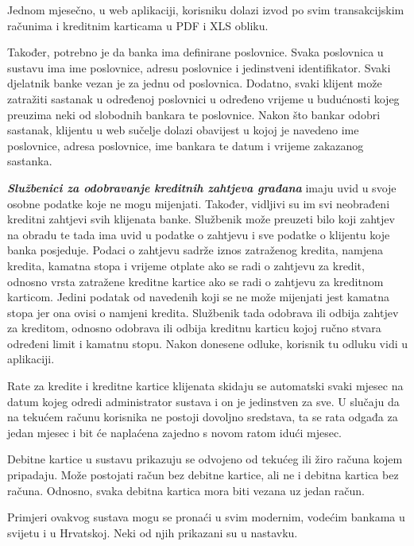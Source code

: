 		Jednom mjesečno, u web aplikaciji, korisniku dolazi izvod po svim transakcijskim računima i kreditnim karticama u PDF i XLS obliku.
		
		Također, potrebno je da banka ima definirane poslovnice. Svaka poslovnica u sustavu ima ime poslovnice, adresu poslovnice i jedinstveni identifikator. Svaki djelatnik banke vezan je za jednu od poslovnica. Dodatno, svaki klijent može zatražiti sastanak u određenoj poslovnici u određeno vrijeme u budućnosti kojeg preuzima neki od slobodnih bankara te poslovnice. Nakon što bankar odobri sastanak, klijentu u web sučelje dolazi obavijest u kojoj je navedeno ime poslovnice, adresa poslovnice, ime bankara te datum i vrijeme zakazanog sastanka.
		
		\textit{\textbf{Službenici za odobravanje kreditnih zahtjeva građana}} imaju uvid u svoje osobne podatke koje ne mogu mijenjati. Također, vidljivi su im svi neobrađeni kreditni zahtjevi svih klijenata banke. Službenik može preuzeti bilo koji zahtjev na obradu te tada ima uvid u podatke o zahtjevu i sve podatke o klijentu koje banka posjeduje. Podaci o zahtjevu sadrže iznos zatraženog kredita, namjena kredita, kamatna stopa i vrijeme otplate ako se radi o zahtjevu za kredit, odnosno vrsta zatražene kreditne kartice ako se radi o zahtjevu za kreditnom karticom. Jedini podatak od navedenih koji se ne može mijenjati jest kamatna stopa jer ona ovisi o namjeni kredita. Službenik tada odobrava ili odbija zahtjev za kreditom, odnosno odobrava ili odbija kreditnu karticu kojoj ručno stvara određeni limit i kamatnu stopu.
		Nakon donesene odluke, korisnik tu odluku vidi u aplikaciji.
		
		Rate za kredite i kreditne kartice klijenata skidaju se automatski svaki mjesec na datum kojeg odredi administrator sustava i on je jedinstven za sve. U slučaju da na tekućem računu korisnika ne postoji dovoljno sredstava, ta se rata odgađa za jedan mjesec i bit će naplaćena zajedno s novom ratom idući mjesec.
		
		Debitne kartice u sustavu prikazuju se odvojeno od tekućeg ili žiro računa kojem pripadaju. Može postojati račun bez debitne kartice, ali ne i debitna kartica bez računa. Odnosno, svaka debitna kartica mora biti vezana uz jedan račun.
		
		Primjeri ovakvog sustava mogu se pronaći u svim modernim, vodećim bankama u svijetu i u Hrvatskoj. Neki od njih prikazani su u nastavku.
		
